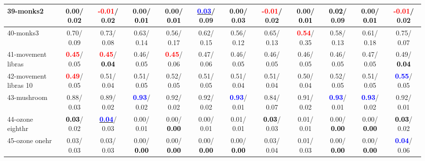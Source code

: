 \begin{table}[h]
\begin{center}
{\begin{tabular}{lc|c|c|c|c|c|c|c|c|c|c}
39-monks2 &   0.00/  0.02 & \textcolor{red}{\textbf{ -0.01}}/  0.02 &   0.00/\textcolor{black}{\textbf{  0.01}} &   0.00/\textcolor{black}{\textbf{  0.01}} & \underline{\textcolor{blue}{\textbf{  0.03}}}/  0.09 &   0.00/  0.03 & \textcolor{red}{\textbf{ -0.01}}/  0.02 &   0.00/\textcolor{black}{\textbf{  0.01}} & \textcolor{black}{\textbf{  0.02}}/  0.09 &   0.00/\textcolor{black}{\textbf{  0.01}} & \textcolor{red}{\textbf{ -0.01}}/  0.02 \\ \hline
40-monks3 &   0.70/  0.09 &   0.73/  0.08 &   0.63/  0.14 &   0.56/  0.17 &   0.62/  0.15 &   0.56/  0.12 &   0.65/  0.13 & \textcolor{red}{\textbf{  0.54}}/  0.35 &   0.58/  0.13 &   0.61/  0.18 &   0.75/  0.07 \\
41-movement libras & \textcolor{red}{\textbf{  0.45}}/  0.05 & \textcolor{red}{\textbf{  0.45}}/\textcolor{black}{\textbf{  0.04}} &   0.46/  0.05 & \textcolor{red}{\textbf{  0.45}}/  0.06 &   0.47/  0.06 &   0.46/  0.05 &   0.46/  0.05 &   0.46/  0.05 &   0.46/  0.05 &   0.47/  0.05 &   0.49/\textcolor{black}{\textbf{  0.04}} \\
42-movement libras 10 & \textcolor{red}{\textbf{  0.49}}/  0.05 &   0.51/  0.04 &   0.51/  0.05 &   0.52/  0.05 &   0.51/  0.05 &   0.51/  0.04 &   0.51/  0.04 &   0.50/  0.04 &   0.52/  0.05 &   0.51/  0.05 & \textcolor{blue}{\textbf{  0.55}}/  0.05 \\
43-mushroom &   0.88/  0.03 &   0.89/  0.02 & \textcolor{blue}{\textbf{  0.93}}/  0.02 &   0.92/  0.02 &   0.92/  0.02 & \textcolor{blue}{\textbf{  0.93}}/  0.01 &   0.84/  0.07 &   0.91/  0.02 & \textcolor{blue}{\textbf{  0.93}}/  0.01 & \textcolor{blue}{\textbf{  0.93}}/  0.02 &   0.92/  0.01 \\
44-ozone eighthr & \textcolor{black}{\textbf{  0.03}}/  0.02 & \underline{\textcolor{blue}{\textbf{  0.04}}}/  0.03 &   0.00/  0.01 &   0.00/\textcolor{black}{\textbf{  0.00}} &   0.00/  0.01 &   0.01/  0.01 & \textcolor{black}{\textbf{  0.03}}/  0.03 &   0.01/  0.01 &   0.00/\textcolor{black}{\textbf{  0.00}} &   0.00/\textcolor{black}{\textbf{  0.00}} & \textcolor{black}{\textbf{  0.03}}/  0.02 \\
45-ozone onehr &   0.03/  0.03 &   0.03/  0.03 &   0.00/\textcolor{black}{\textbf{  0.00}} &   0.00/\textcolor{black}{\textbf{  0.00}} &   0.00/\textcolor{black}{\textbf{  0.00}} &   0.00/\textcolor{black}{\textbf{  0.00}} &   0.03/  0.04 &   0.01/  0.03 &   0.00/\textcolor{black}{\textbf{  0.00}} &   0.00/\textcolor{black}{\textbf{  0.00}} & \textcolor{blue}{\textbf{  0.04}}/  0.06 \\

\end{tabular}}
\end{center}
\end{table}
